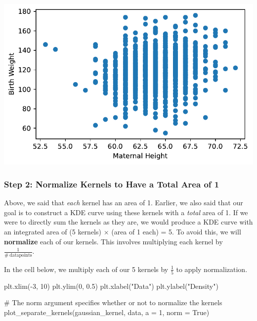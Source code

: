 \documentclass[
  letterpaper,
  DIV=11,
  numbers=noendperiod]{scrreprt}
\newenvironment{Shaded}{\begin{snugshade}}{\end{snugshade}}
\newcommand{\CommentTok}[1]{\textcolor[rgb]{0.37,0.37,0.37}{#1}}
\newcommand{\DecValTok}[1]{\textcolor[rgb]{0.68,0.00,0.00}{#1}}
\newcommand{\FloatTok}[1]{\textcolor[rgb]{0.68,0.00,0.00}{#1}}
\newcommand{\NormalTok}[1]{\textcolor[rgb]{0.00,0.23,0.31}{#1}}
\newcommand{\OperatorTok}[1]{\textcolor[rgb]{0.37,0.37,0.37}{#1}}
\newcommand{\StringTok}[1]{\textcolor[rgb]{0.13,0.47,0.30}{#1}}
\newcommand{\VariableTok}[1]{\textcolor[rgb]{0.07,0.07,0.07}{#1}}
\begin{document}
\includegraphics{visualization_2/visualization_2_files/figure-pdf/cell-7-output-1.pdf}

\subsubsection{Step 2: Normalize Kernels to Have a Total Area of
1}\label{step-2-normalize-kernels-to-have-a-total-area-of-1}

Above, we said that \emph{each} kernel has an area of 1. Earlier, we
also said that our goal is to construct a KDE curve using these kernels
with a \emph{total} area of 1. If we were to directly sum the kernels as
they are, we would produce a KDE curve with an integrated area of (5
kernels) \(\times\) (area of 1 each) = 5. To avoid this, we will
\textbf{normalize} each of our kernels. This involves multiplying each
kernel by \(\frac{1}{\#\:\text{datapoints}}\).

In the cell below, we multiply each of our 5 kernels by \(\frac{1}{5}\)
to apply normalization.

\begin{Shaded}
\begin{Highlighting}[]
\NormalTok{plt.xlim(}\OperatorTok{{-}}\DecValTok{3}\NormalTok{, }\DecValTok{10}\NormalTok{)}
\NormalTok{plt.ylim(}\DecValTok{0}\NormalTok{, }\FloatTok{0.5}\NormalTok{)}
\NormalTok{plt.xlabel(}\StringTok{"Data"}\NormalTok{)}
\NormalTok{plt.ylabel(}\StringTok{"Density"}\NormalTok{)}

\CommentTok{\# The \textasciigrave{}norm\textasciigrave{} argument specifies whether or not to normalize the kernels}
\NormalTok{plot\_separate\_kernels(gaussian\_kernel, data, a }\OperatorTok{=} \DecValTok{1}\NormalTok{, norm }\OperatorTok{=} \VariableTok{True}\NormalTok{)}
\end{Highlighting}
\end{Shaded}
\end{document}
